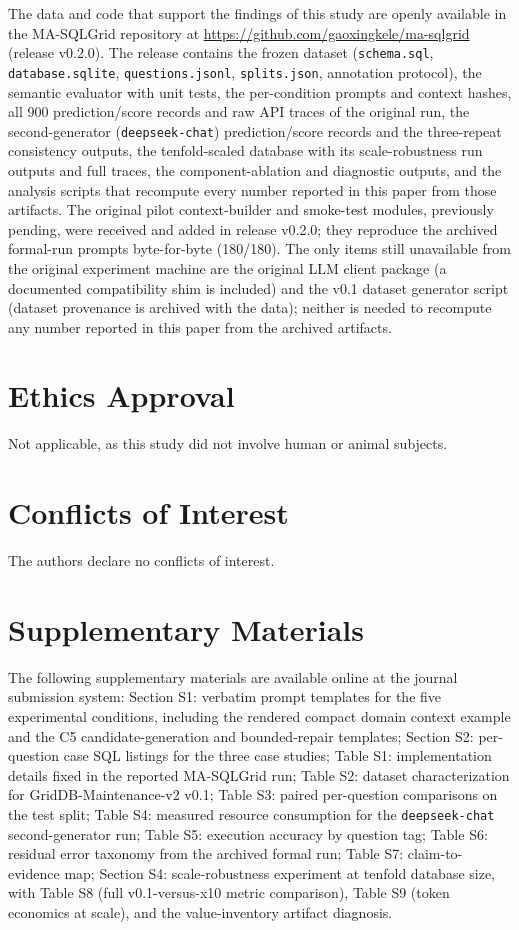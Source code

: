 \documentclass{article}
\begin{document}
The data and code that support the findings of this study are openly available in the MA-SQLGrid repository at \url{https://github.com/gaoxingkele/ma-sqlgrid} (release v0.2.0). The release contains the frozen dataset (\texttt{schema.sql}, \texttt{database.sqlite}, \texttt{questions.jsonl}, \texttt{splits.json}, annotation protocol), the semantic evaluator with unit tests, the per-condition prompts and context hashes, all 900 prediction/score records and raw API traces of the original run, the second-generator (\texttt{deepseek-chat}) prediction/score records and the three-repeat consistency outputs, the tenfold-scaled database with its scale-robustness run outputs and full traces, the component-ablation and diagnostic outputs, and the analysis scripts that recompute every number reported in this paper from those artifacts. The original pilot context-builder and smoke-test modules, previously pending, were received and added in release v0.2.0; they reproduce the archived formal-run prompts byte-for-byte (180/180). The only items still unavailable from the original experiment machine are the original LLM client package (a documented compatibility shim is included) and the v0.1 dataset generator script (dataset provenance is archived with the data); neither is needed to recompute any number reported in this paper from the archived artifacts.
\section*{Ethics Approval}

Not applicable, as this study did not involve human or animal subjects.
\section*{Conflicts of Interest}

The authors declare no conflicts of interest.
\section*{Supplementary Materials}

The following supplementary materials are available online at the journal submission system: Section S1: verbatim prompt templates for the five experimental conditions, including the rendered compact domain context example and the C5 candidate-generation and bounded-repair templates; Section S2: per-question case SQL listings for the three case studies; Table S1: implementation details fixed in the reported MA-SQLGrid run; Table S2: dataset characterization for GridDB-Maintenance-v2 v0.1; Table S3: paired per-question comparisons on the test split; Table S4: measured resource consumption for the \texttt{deepseek-chat} second-generator run; Table S5: execution accuracy by question tag; Table S6: residual error taxonomy from the archived formal run; Table S7: claim-to-evidence map; Section S4: scale-robustness experiment at tenfold database size, with Table S8 (full v0.1-versus-x10 metric comparison), Table S9 (token economics at scale), and the value-inventory artifact diagnosis.


\end{document}
